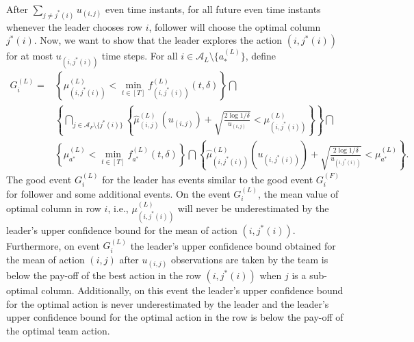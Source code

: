 \documentclass[letterpaper]{article} %
\theoremstyle{definition}
\def\mc{\mathcal}
\begin{document}
After $\sum_{j \neq j^{\ast}(i)} u_{(i,j)}$ even time instants, for all future even time instants whenever the leader chooses row $i$, follower will choose the optimal column $j^{\ast}(i)$. Now, we want to show that the leader explores the action $(i, j^{\ast}(i))$ for at most $u_{(i, j^{\ast}(i))} $ time steps. For all $i \in \mc{A}_L \setminus \{a^{(L)}_{\ast}\}$, define 
\begin{align}
    G^{(L)}_{i}
    = 
    &\left\{
    \mu^{(L)}_{(i,j^{\ast}(i))} < \min_{t \in [T]} f^{(L)}_{(i,j^{\ast}(i))}(t, \delta)
    \right\} \bigcap \\
    & \left\{
    \bigcap_{j \in \mc{A}_F \setminus \{j^{\ast}(i)\}}
    \left\{
    \hat{\mu}^{(L)}_{(i, j)}(u_{(i, j)})+ \sqrt{\frac{2\log1/\delta}{u_{(i, j)}}}
    < \mu^{(L)}_{(i,j^{\ast}(i))}
    \right\}\right\}\bigcap 
    \\
    & \left\{
    \mu^{(L)}_{a^{\ast}} < \min_{t \in [T]} f^{(L)}_{a^{\ast}}(t, \delta)
    \right\} \bigcap
    \left\{
    \hat{\mu}^{(L)}_{(i, j^{\ast}(i))}(u_{(i, j^{\ast}(i))})+ \sqrt{\frac{2\log1/\delta}{u_{(i, j^{\ast}(i))}}}
    < \mu^{(L)}_{a^{\ast}}
    \right\}.
\end{align}
The good event $G^{(L)}_{i}$ for the leader has events similar to the good event $G^{(F)}_{i}$ for follower and some additional events. On the event $G^{(L)}_{i}$, the mean value of optimal column in row $i$, i.e., $\mu^{(L)}_{(i, j^{\ast}(i))}$ will never be underestimated by the leader's upper confidence bound for the mean of action $(i, j^{\ast}(i))$. Furthermore, on event $G^{(L)}_{i}$ the leader's upper confidence bound obtained for the mean of action $(i,j)$ after $u_{(i, j)}$ observations are taken by the team is below the pay-off of the best action in the row $(i, j^{\ast}(i))$ when $j$ is a sub-optimal column. Additionally, on this event the leader's upper confidence bound for the optimal action is never underestimated by the leader and the leader's upper confidence bound for the optimal action in the row is below the pay-off of the optimal team action. 
\end{document}
